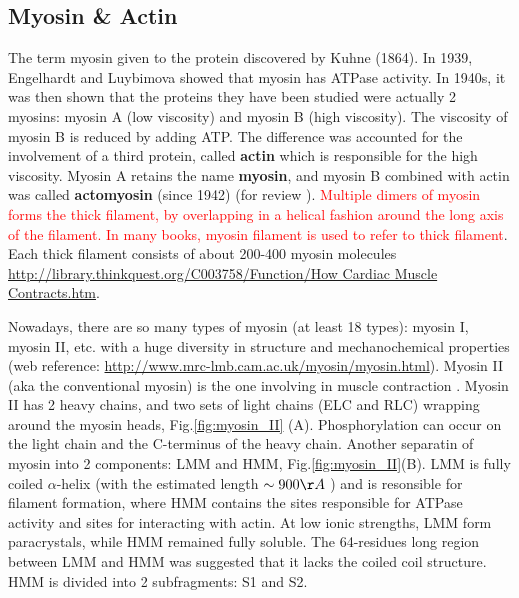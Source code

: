 \subsection{Myosin \& Actin}

The term myosin given to the protein discovered by Kuhne (1864).
In 1939, Engelhardt and Luybimova showed that myosin has ATPase activity. In
1940s, it was then shown that the proteins they have been studied were actually
2 myosins: myosin A (low viscosity) and myosin B (high viscosity). The viscosity
of myosin B is reduced by adding ATP.
The difference was accounted for the involvement of a third protein, called {\bf
actin} which is responsible for the high viscosity. Myosin A retains the name
{\bf myosin}, and myosin B combined with actin was called {\bf actomyosin}
(since 1942) (for review \citep{szent-gyorgyi2004}).
\textcolor{red}{Multiple dimers of myosin forms the thick filament, by
overlapping in a helical fashion around the long axis of the filament.
In many books, myosin filament is used to refer to thick filament}.
Each thick filament consists of about 200-400 myosin molecules
\citep{hanson1963}
\url{http://library.thinkquest.org/C003758/Function/How Cardiac Muscle
Contracts.htm}.

Nowadays, there are so many types of myosin (at least 18 types): myosin I,
myosin II, etc. with a huge diversity in structure and mechanochemical
properties \cite{hodge2000, berg2001}
(web reference: \url{http://www.mrc-lmb.cam.ac.uk/myosin/myosin.html}). Myosin
II (aka the conventional myosin) is the one involving in muscle contraction
\citep{cooke1997}.
Myosin II has 2 heavy chains, and two sets of light chains (ELC and RLC)
wrapping around the myosin heads, Fig.\ref{fig:myosin_II} (A). Phosphorylation
can occur on the light chain and the C-terminus of the heavy chain. Another
separatin of myosin into 2 components: LMM and HMM, Fig.\ref{fig:myosin_II}(B).
LMM is fully coiled $\alpha$-helix (with the estimated length $\sim 900 \AA$
\citep{huxley1963}) and is resonsible for filament formation, where HMM contains
the sites responsible for ATPase activity and sites for interacting with actin.
At low ionic strengths, LMM form paracrystals, while HMM remained fully soluble.
The 64-residues long region between LMM and HMM  was suggested that it lacks the
coiled coil structure. HMM is divided into 2 subfragments: S1 and S2.

